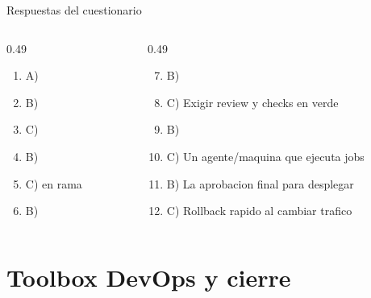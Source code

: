 \documentclass[aspectratio=169]{beamer}
\begin{document}
\begin{frame}{Respuestas del cuestionario}
	\small
	\begin{columns}[T,onlytextwidth]
		\begin{column}{0.49\textwidth}
			\begin{enumerate}
				\item A) 
				\item B) 
				\item C) 
				\item B) 
				\item C)  en rama 
				\item B) 
			\end{enumerate}
		\end{column}
		\begin{column}{0.49\textwidth}
			\begin{enumerate}
				\setcounter{enumi}{6}
				\item B) 
				\item C) Exigir review y checks en verde
				\item B) 
				\item C) Un agente/maquina que ejecuta jobs
				\item B) La aprobacion final para desplegar
				\item C) Rollback rapido al cambiar trafico
			\end{enumerate}
		\end{column}
	\end{columns}
\end{frame}

\section{Toolbox DevOps y cierre}
\end{document}
